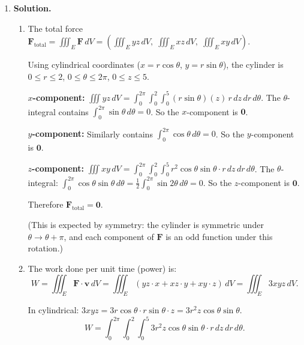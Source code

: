 \begin{enumerate}
The Jacobian: $x=3u$, $y=2v$, $z=w$, so $\frac{\partial(x,y,z)}{\partial(u,v,w)} = 3\cdot 2\cdot 1 = 6$.

The density: $\rho = \sqrt{x^2+y^2+z^2} = \sqrt{9u^2+4v^2+w^2}$.

The total mass:
\[
\boxed{M = 6\int\!\!\!\int\!\!\!\int_{u^2+v^2+w^2\le 1}\sqrt{9u^2+4v^2+w^2}\,du\,dv\,dw}.
\]

(This can be further converted to spherical coordinates in $(u,v,w)$-space, though the integrand $\sqrt{9\sin^2\alpha\cos^2\beta+4\sin^2\alpha\sin^2\beta+\cos^2\alpha}$ would depend on angles and not simplify to a closed form easily.)

\item \textbf{Solution.}
\begin{enumerate}
\item The total force $\mathbf{F}_{\text{total}} = \iiint_E \mathbf{F}\,dV = \left(\iiint_E yz\,dV,\;\iiint_E xz\,dV,\;\iiint_E xy\,dV\right)$.

Using cylindrical coordinates ($x=r\cos\theta$, $y=r\sin\theta$), the cylinder is $0\le r\le 2$, $0\le\theta\le 2\pi$, $0\le z\le 5$.

\textbf{$x$-component:} $\iiint yz\,dV = \int_0^{2\pi}\int_0^2\int_0^5 (r\sin\theta)(z)\,r\,dz\,dr\,d\theta$. The $\theta$-integral contains $\int_0^{2\pi}\sin\theta\,d\theta = 0$. So the $x$-component is $\mathbf{0}$.

\textbf{$y$-component:} Similarly contains $\int_0^{2\pi}\cos\theta\,d\theta = 0$. So the $y$-component is $\mathbf{0}$.

\textbf{$z$-component:} $\iiint xy\,dV = \int_0^{2\pi}\int_0^2\int_0^5 r^2\cos\theta\sin\theta\cdot r\,dz\,dr\,d\theta$. The $\theta$-integral: $\int_0^{2\pi}\cos\theta\sin\theta\,d\theta = \frac{1}{2}\int_0^{2\pi}\sin 2\theta\,d\theta = 0$. So the $z$-component is $\mathbf{0}$.

Therefore $\boxed{\mathbf{F}_{\text{total}} = \mathbf{0}}$.

(This is expected by symmetry: the cylinder is symmetric under $\theta\to\theta+\pi$, and each component of $\mathbf{F}$ is an odd function under this rotation.)

\item The work done per unit time (power) is:
\[
W = \iiint_E \mathbf{F}\cdot\mathbf{v}\,dV = \iiint_E (yz\cdot x + xz\cdot y + xy\cdot z)\,dV = \iiint_E 3xyz\,dV.
\]

In cylindrical: $3xyz = 3r\cos\theta\cdot r\sin\theta\cdot z = 3r^2 z\cos\theta\sin\theta$.
\[
W = \int_0^{2\pi}\int_0^2\int_0^5 3r^2 z\cos\theta\sin\theta\cdot r\,dz\,dr\,d\theta.
\]


\end{enumerate}
\end{enumerate}
